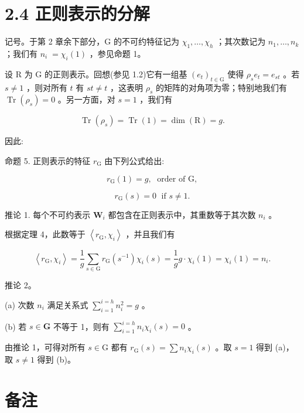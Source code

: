\documentclass[10pt]{article}
\begin{document}
\section*{2.4 正则表示的分解}

记号。于第 2 章余下部分，G 的不可约特征记为 \({\chi }_{1},\ldots ,{\chi }_{h}\) ；其次数记为 \({n}_{1},\ldots ,{n}_{k}\) ；我们有 \({n}_{i} \; = {\chi }_{i}\left( 1\right)\) ，参见命题 1。

设 \(\mathrm{R}\) 为 \(\mathrm{G}\) 的正则表示。回想(参见 1.2)它有一组基 \({\left( {e}_{t}\right) }_{t \in  \mathrm{G}}\) 使得 \({\rho }_{s}{e}_{t} = {e}_{st}\) 。若 \(s \neq  1\) ，则对所有 \(t\) 有 \({st} \neq  t\) ，这表明 \({\rho }_{s}\) 的矩阵的对角项为零；特别地我们有 \(\operatorname{Tr}\left( {\rho }_{s}\right)  = 0\) 。另一方面，对 \(s = 1\) ，我们有

\[
\operatorname{Tr}\left( {\rho }_{s}\right)  = \operatorname{Tr}\left( 1\right)  = \dim \left( \mathrm{R}\right)  = g.
\]

因此:

命题 5. 正则表示的特征 \({r}_{\mathrm{G}}\) 由下列公式给出:

\[
{r}_{\mathrm{G}}\left( 1\right)  = g,\;\text{ order of }\mathrm{G},
\]

\[
{r}_{\mathrm{G}}\left( s\right)  = 0\;\text{ if }s \neq  1.
\]

推论 1. 每个不可约表示 \({\mathbf{W}}_{i}\) 都包含在正则表示中，其重数等于其次数 \({n}_{i}\) 。

根据定理 4，此数等于 \(\left\langle  {{r}_{\mathrm{G}},{\chi }_{i}}\right\rangle\) ，并且我们有

\[
\left\langle  {{r}_{\mathrm{G}},{\chi }_{i}}\right\rangle   = \frac{1}{g}\mathop{\sum }\limits_{{s \in  \mathrm{G}}}{r}_{\mathrm{G}}\left( {s}^{-1}\right) {\chi }_{i}\left( s\right)  = \frac{1}{g}g \cdot  {\chi }_{i}\left( 1\right)  = {\chi }_{i}\left( 1\right)  = {n}_{i}.
\]

推论 2。

(a) 次数 \({n}_{i}\) 满足关系式 \(\mathop{\sum }\limits_{{i = 1}}^{{i = h}}{n}_{i}^{2} = g\) 。

(b) 若 \(s \in  \mathbf{G}\) 不等于 1，则有 \(\mathop{\sum }\limits_{{i = 1}}^{{i = h}}{n}_{i}{\chi }_{i}\left( s\right)  = 0\) 。

由推论 1，可得对所有 \(s \in  \mathrm{G}\) 都有 \({r}_{\mathrm{G}}\left( s\right)  = \sum {n}_{i}{\chi }_{i}\left( s\right)\) 。取 \(s = 1\) 得到 (a)，取 \(s \neq  1\) 得到 (b)。

\section*{备注}
\end{document}
